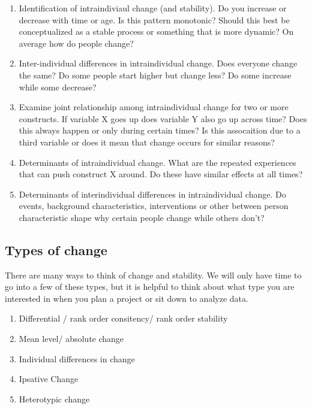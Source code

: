 \documentclass[]{book}
\begin{document}
\begin{enumerate}
\def\labelenumi{\arabic{enumi}.}
\item
  Identification of intraindiviaul change (and stability). Do you
  increase or decrease with time or age. Is this pattern monotonic?
  Should this best be conceptualized as a stable process or something
  that is more dynamic? On average how do people change?
\item
  Inter-individual differences in intraindividual change. Does everyone
  change the same? Do some people start higher but change less? Do some
  increase while some decrease?
\item
  Examine joint relationship among intraindividual change for two or
  more constructs. If variable X goes up does variable Y also go up
  across time? Does this always happen or only during certain times? Is
  this assocaition due to a third variable or does it mean that change
  occurs for similar reasons?
\item
  Determinants of intraindividual change. What are the repeated
  experiences that can push construct X around. Do these have similar
  effects at all times?
\item
  Determinants of interindividual differences in intraindividual change.
  Do events, background characteristics, interventions or other between
  person characteristic shape why certain people change while others
  don't?
\end{enumerate}

\subsection{Types of change}\label{types-of-change}

There are many ways to think of change and stability. We will only have
time to go into a few of these types, but it is helpful to think about
what type you are interested in when you plan a project or sit down to
analyze data.

\begin{enumerate}
\def\labelenumi{\arabic{enumi}.}
\item
  Differential / rank order consitency/ rank order stability
\item
  Mean level/ absolute change
\item
  Individual differences in change
\item
  Ipsative Change
\item
  Heterotypic change
\end{enumerate}
\end{document}
